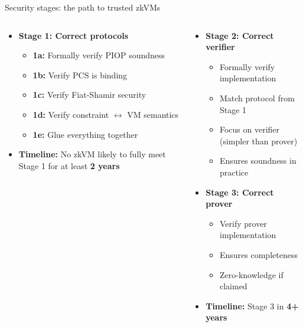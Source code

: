 \documentclass[aspectratio=169, lualatex, handout]{beamer}
\begin{document}
\begin{frame}{Security stages: the path to trusted zkVMs}
	\begin{columns}[c]
		\begin{column}{0.5\textwidth}
			\begin{itemize}
				\item \textbf{Stage 1: Correct protocols}
				      \begin{itemize}
					      \item \textbf{1a:} Formally verify PIOP soundness
					      \item \textbf{1b:} Verify PCS is binding
					      \item \textbf{1c:} Verify Fiat-Shamir security
					      \item \textbf{1d:} Verify constraint $\leftrightarrow$ VM semantics
					      \item \textbf{1e:} Glue everything together
				      \end{itemize}
				\item \textbf{Timeline:} No zkVM likely to fully meet Stage 1 for at least \textbf{2 years}
			\end{itemize}
		\end{column}
		\begin{column}{0.5\textwidth}
			\begin{itemize}
				\item \textbf{Stage 2: Correct verifier}
				      \begin{itemize}
					      \item Formally verify implementation
					      \item Match protocol from Stage 1
					      \item Focus on verifier (simpler than prover)
					      \item Ensures soundness in practice
				      \end{itemize}
				\item \textbf{Stage 3: Correct prover}
				      \begin{itemize}
					      \item Verify prover implementation
					      \item Ensures completeness
					      \item Zero-knowledge if claimed
				      \end{itemize}
				\item \textbf{Timeline:} Stage 3 in \textbf{4+ years}
			\end{itemize}
		\end{column}
	\end{columns}
\end{frame}
\end{document}

